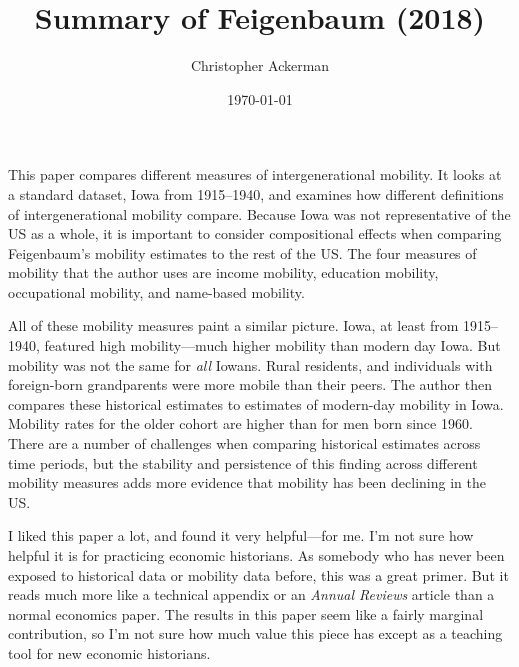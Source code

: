\documentclass[dvipsnames]{article}
\title{Summary of Feigenbaum (2018)}
\author{Christopher Ackerman}
\date{\today}
\begin{document}
\maketitle
This paper compares different measures of intergenerational mobility. It looks at a standard dataset, Iowa from 1915--1940, and examines how different definitions of intergenerational mobility compare. Because Iowa was not representative of the US as a whole, it is important to consider compositional effects when comparing Feigenbaum's mobility estimates to the rest of the US. The four measures of mobility that the author uses are income mobility, education mobility, occupational mobility, and name-based mobility.

All of these mobility measures paint a similar picture. Iowa, at least from 1915--1940, featured high mobility---much higher mobility than modern day Iowa. But mobility was not the same for \emph{all} Iowans. Rural residents, and individuals with foreign-born grandparents were more mobile than their peers. The author then compares these historical estimates to estimates of modern-day mobility in Iowa. Mobility rates for the older cohort are higher than for men born since 1960. There are a number of challenges when comparing historical estimates across time periods, but the stability and persistence of this finding across different mobility measures adds more evidence that mobility has been declining in the US.

I liked this paper a lot, and found it very helpful---for me. I'm not sure how helpful it is for practicing economic historians. As somebody who has never been exposed to historical data or mobility data before, this was a great primer. But it reads much more like a technical appendix or an \emph{Annual Reviews} article than a normal economics paper. The results in this paper seem like a fairly marginal contribution, so I'm not sure how much value this piece has except as a teaching tool for new economic historians.
\end{document}
